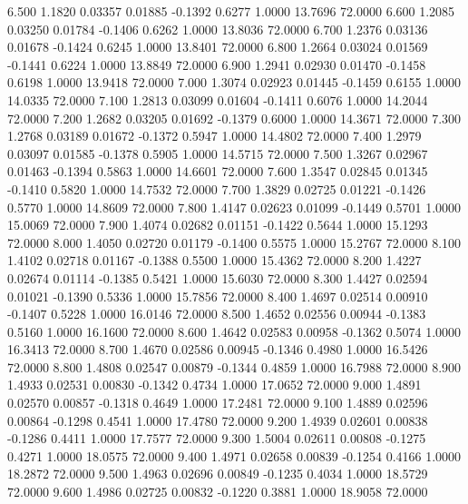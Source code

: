    6.500   1.1820   0.03357   0.01885  -0.1392   0.6277   1.0000  13.7696  72.0000
   6.600   1.2085   0.03250   0.01784  -0.1406   0.6262   1.0000  13.8036  72.0000
   6.700   1.2376   0.03136   0.01678  -0.1424   0.6245   1.0000  13.8401  72.0000
   6.800   1.2664   0.03024   0.01569  -0.1441   0.6224   1.0000  13.8849  72.0000
   6.900   1.2941   0.02930   0.01470  -0.1458   0.6198   1.0000  13.9418  72.0000
   7.000   1.3074   0.02923   0.01445  -0.1459   0.6155   1.0000  14.0335  72.0000
   7.100   1.2813   0.03099   0.01604  -0.1411   0.6076   1.0000  14.2044  72.0000
   7.200   1.2682   0.03205   0.01692  -0.1379   0.6000   1.0000  14.3671  72.0000
   7.300   1.2768   0.03189   0.01672  -0.1372   0.5947   1.0000  14.4802  72.0000
   7.400   1.2979   0.03097   0.01585  -0.1378   0.5905   1.0000  14.5715  72.0000
   7.500   1.3267   0.02967   0.01463  -0.1394   0.5863   1.0000  14.6601  72.0000
   7.600   1.3547   0.02845   0.01345  -0.1410   0.5820   1.0000  14.7532  72.0000
   7.700   1.3829   0.02725   0.01221  -0.1426   0.5770   1.0000  14.8609  72.0000
   7.800   1.4147   0.02623   0.01099  -0.1449   0.5701   1.0000  15.0069  72.0000
   7.900   1.4074   0.02682   0.01151  -0.1422   0.5644   1.0000  15.1293  72.0000
   8.000   1.4050   0.02720   0.01179  -0.1400   0.5575   1.0000  15.2767  72.0000
   8.100   1.4102   0.02718   0.01167  -0.1388   0.5500   1.0000  15.4362  72.0000
   8.200   1.4227   0.02674   0.01114  -0.1385   0.5421   1.0000  15.6030  72.0000
   8.300   1.4427   0.02594   0.01021  -0.1390   0.5336   1.0000  15.7856  72.0000
   8.400   1.4697   0.02514   0.00910  -0.1407   0.5228   1.0000  16.0146  72.0000
   8.500   1.4652   0.02556   0.00944  -0.1383   0.5160   1.0000  16.1600  72.0000
   8.600   1.4642   0.02583   0.00958  -0.1362   0.5074   1.0000  16.3413  72.0000
   8.700   1.4670   0.02586   0.00945  -0.1346   0.4980   1.0000  16.5426  72.0000
   8.800   1.4808   0.02547   0.00879  -0.1344   0.4859   1.0000  16.7988  72.0000
   8.900   1.4933   0.02531   0.00830  -0.1342   0.4734   1.0000  17.0652  72.0000
   9.000   1.4891   0.02570   0.00857  -0.1318   0.4649   1.0000  17.2481  72.0000
   9.100   1.4889   0.02596   0.00864  -0.1298   0.4541   1.0000  17.4780  72.0000
   9.200   1.4939   0.02601   0.00838  -0.1286   0.4411   1.0000  17.7577  72.0000
   9.300   1.5004   0.02611   0.00808  -0.1275   0.4271   1.0000  18.0575  72.0000
   9.400   1.4971   0.02658   0.00839  -0.1254   0.4166   1.0000  18.2872  72.0000
   9.500   1.4963   0.02696   0.00849  -0.1235   0.4034   1.0000  18.5729  72.0000
   9.600   1.4986   0.02725   0.00832  -0.1220   0.3881   1.0000  18.9058  72.0000
